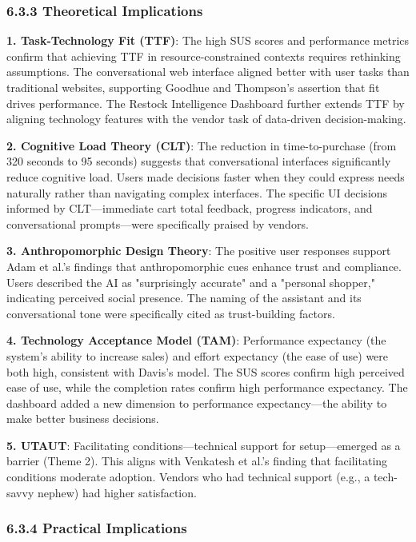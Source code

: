 \documentclass[12pt,a4paper]{article}
\begin{document}
\subsubsection{6.3.3 Theoretical Implications}

\textbf{1. Task-Technology Fit (TTF)}: The high SUS scores and performance metrics confirm that achieving TTF in resource-constrained contexts requires rethinking assumptions. The conversational web interface aligned better with user tasks than traditional websites, supporting Goodhue and Thompson's \citep{goodhue1995} assertion that fit drives performance. The Restock Intelligence Dashboard further extends TTF by aligning technology features with the vendor task of data-driven decision-making.

\textbf{2. Cognitive Load Theory (CLT)}: The reduction in time-to-purchase (from 320 seconds to 95 seconds) suggests that conversational interfaces significantly reduce cognitive load. Users made decisions faster when they could express needs naturally rather than navigating complex interfaces. The specific UI decisions informed by CLT---immediate cart total feedback, progress indicators, and conversational prompts---were specifically praised by vendors.

\textbf{3. Anthropomorphic Design Theory}: The positive user responses support Adam et al.'s \citep{adam2021} findings that anthropomorphic cues enhance trust and compliance. Users described the AI as "surprisingly accurate" and a "personal shopper," indicating perceived social presence. The naming of the assistant and its conversational tone were specifically cited as trust-building factors.

\textbf{4. Technology Acceptance Model (TAM)}: Performance expectancy (the system's ability to increase sales) and effort expectancy (the ease of use) were both high, consistent with Davis's \citep{davis1989} model. The SUS scores confirm high perceived ease of use, while the completion rates confirm high performance expectancy. The dashboard added a new dimension to performance expectancy---the ability to make better business decisions.

\textbf{5. UTAUT}: Facilitating conditions---technical support for setup---emerged as a barrier (Theme 2). This aligns with Venkatesh et al.'s \citep{venkatesh2003} finding that facilitating conditions moderate adoption. Vendors who had technical support (e.g., a tech-savvy nephew) had higher satisfaction.

\subsubsection{6.3.4 Practical Implications}
\end{document}
